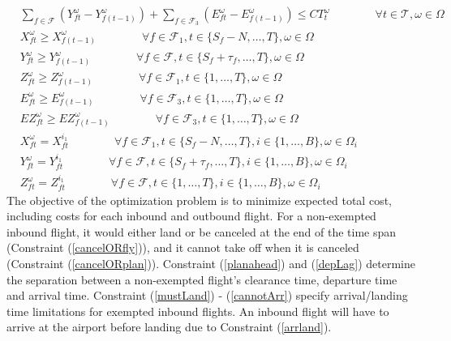\documentclass[12pt]{article}
\begin{document}
\begin{align}
		& \sum_{f \in \mathcal{F}}\left(Y_{ft}^\omega - Y_{f(t-1)}^\omega\right) + \sum_{f \in \mathcal{F}_3}\left(E_{ft}^\omega - E_{f(t-1)}^\omega\right) \leq CT_t^\omega \qquad \qquad \forall t \in \mathcal{T}, \omega \in \Omega \label{totalCap}\\
		& X_{ft}^\omega \geq X_{f(t-1)}^\omega \qquad \qquad \forall f \in \mathcal{F}_1, t \in \{S_f - N, \dots, T\}, \omega \in \Omega \label{xupdate}\\
		& Y_{ft}^\omega \geq Y_{f(t-1)}^\omega \qquad \qquad \forall f \in \mathcal{F}, t \in \{S_f + \tau_f, \dots, T\}, \omega \in \Omega \label{yupdate}\\
		& Z_{ft}^\omega \geq Z_{f(t-1)}^\omega \qquad \qquad \forall f \in \mathcal{F}_1, t \in \{1, \dots, T\}, \omega \in \Omega \label{zupdate}\\
		& E_{ft}^\omega \geq E_{f(t-1)}^\omega \qquad \qquad \forall f \in \mathcal{F}_3, t \in \{1, \dots, T\}, \omega \in \Omega \label{eupdate}\\
		& EZ_{ft}^\omega \geq EZ_{f(t-1)}^\omega \qquad \qquad \forall f \in \mathcal{F}_3, t \in \{1, \dots, T\}, \omega \in \Omega \label{ezupdate}\\
		& X_{ft}^\omega = X_{ft}^{i_1} \qquad \qquad \forall f \in \mathcal{F}_1, t \in \{S_f - N, \dots, T\}, i \in \{1, \dots, B\}, \omega \in \Omega_i \label{nonAntX}\\
		& Y_{ft}^\omega = Y_{ft}^{i_1} \qquad \qquad \forall f \in \mathcal{F}, t \in \{S_f + \tau_f, \dots, T\}, i \in \{1, \dots, B\}, \omega \in \Omega_i \label{nonAntY}\\
		& Z_{ft}^\omega = Z_{ft}^{i_1} \qquad \qquad \forall f \in \mathcal{F}, t \in \{1, \dots, T\}, i \in \{1, \dots, B\}, \omega \in \Omega_i \label{nonAntZ}
	\end{align}
	The objective of the optimization problem is to minimize expected total cost, including costs for each inbound and outbound flight. For a non-exempted inbound flight, it would either land or be canceled at the end of the time span (Constraint (\ref{cancelORfly})), and it cannot take off when it is canceled (Constraint (\ref{cancelORplan})). Constraint (\ref{planahead}) and (\ref{depLag}) determine the separation between a non-exempted flight's clearance time, departure time and arrival time. Constraint (\ref{mustLand}) - (\ref{cannotArr}) specify arrival/landing time limitations for exempted inbound flights. An inbound flight will have to arrive at the airport before landing due to Constraint (\ref{arrland}).\\
\end{document}
